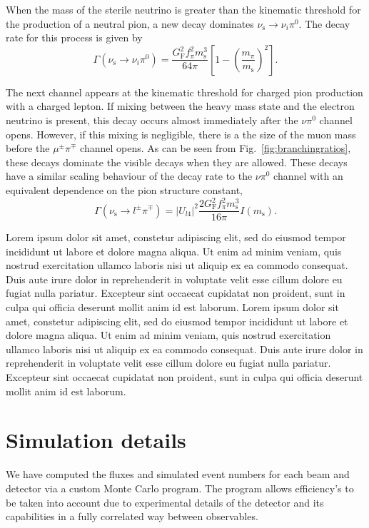 \documentclass[11pt, a4paper]{article}
\newcommand{\reffig}[1]{Fig.~\ref{#1}}
\newcommand{\lorem}{ \textcolor[rgb]{0.8,0.8,0.8}{Lorem ipsum dolor sit amet, constetur
adipiscing elit, sed do eiusmod tempor incididunt ut labore et dolore magna
aliqua. Ut enim ad minim veniam, quis nostrud exercitation ullamco laboris nisi
ut aliquip ex ea commodo consequat. Duis aute irure dolor in reprehenderit in
voluptate velit esse cillum dolore eu fugiat nulla pariatur. Excepteur sint
occaecat cupidatat non proident, sunt in culpa qui officia deserunt mollit anim
id est laborum.}}
\begin{document}
When the mass of the sterile neutrino is greater than the kinematic threshold
for the production of a neutral pion, a new decay dominates
$\nu_\text{s}\to\nu_i \pi^0$. The decay rate for this process is given by
%
\[ \Gamma\left(\nu_\text{s} \to \nu_i \pi^0\right) =
\frac{G_\text{F}^2f_\pi^2m_\text{s}^3}{64\pi}\left[1-\left(\frac{m_\pi}{m_\text{s}}\right)^2\right].
\]

The next channel appears at the kinematic threshold for charged pion production
with a charged lepton. If mixing between the heavy mass state and the electron
neutrino is present, this decay occurs almost immediately after the $\nu\pi^0$
channel opens. However, if this mixing is negligible, there is a the size of
the muon mass before the $\mu^\pm\pi^\mp$ channel opens. As can be seen from
\reffig{fig:branchingratios}, these decays dominate the visible decays when
they are allowed. These decays have a similar scaling behaviour of the decay
rate to the $\nu\pi^0$ channel with an equivalent dependence on the pion
structure constant,
%
\[ \Gamma\left(\nu_\text{s} \to l^\pm\pi^\mp\right) =
\left|U_{l4}\right|^2\frac{2G_\text{F}^2f_\pi^2m_\text{s}^3}{16\pi}I(m_\text{s}).
\]


\lorem\lorem

\section{Simulation details}

We have computed the fluxes and simulated event numbers for each beam and
detector via a custom Monte Carlo program. The program allows efficiency's to
be taken into account due to experimental details of the detector and its
capabilities in a fully correlated way between observables. 
\end{document}
